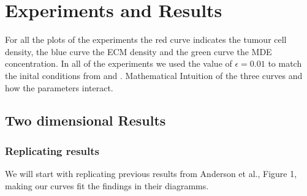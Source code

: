 

\section{Experiments and Results}
For all the plots of the experiments the red curve indicates the tumour cell density, the blue curve the ECM density and the green curve the MDE concentration. In all of the experiments we used the value of $\epsilon = 0.01$ to match the inital conditions from \cite{anderson_mathematical_2000} and \cite{Kolev2010}. \newline 
Mathematical Intuition of the three curves and how the parameters interact.
\subsection{Two dimensional Results}
\subsubsection{Replicating results}
We will start with replicating previous results from Anderson et al.\cite{anderson_mathematical_2000}, Figure 1, making our curves fit the findings in their diagramms. 


